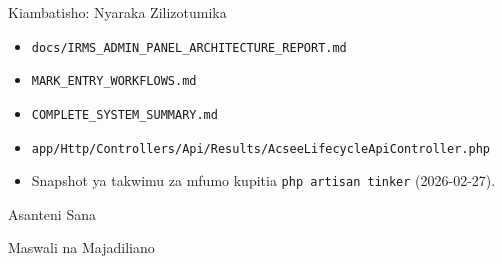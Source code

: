 \documentclass[aspectratio=169,11pt]{beamer}
\begin{document}
\begin{frame}{Kiambatisho: Nyaraka Zilizotumika}
\footnotesize
\begin{itemize}
  \item \texttt{docs/IRMS\_ADMIN\_PANEL\_ARCHITECTURE\_REPORT.md}
  \item \texttt{MARK\_ENTRY\_WORKFLOWS.md}
  \item \texttt{COMPLETE\_SYSTEM\_SUMMARY.md}
  \item \texttt{app/Http/Controllers/Api/Results/AcseeLifecycleApiController.php}
  \item Snapshot ya takwimu za mfumo kupitia \texttt{php artisan tinker} (2026-02-27).
\end{itemize}
\end{frame}

\begin{frame}
\centering
\Huge Asanteni Sana
\vspace{0.35cm}

\Large Maswali na Majadiliano
\end{frame}
\end{document}
